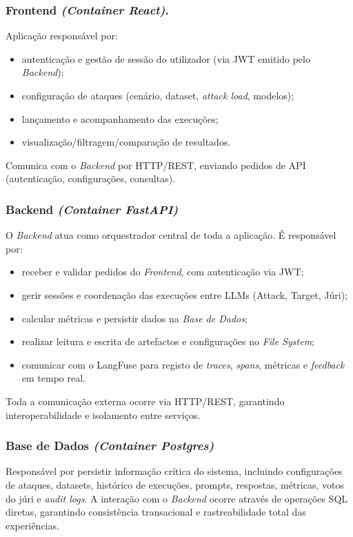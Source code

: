 \subsubsection{Frontend \textit{(Container React)}.}
Aplicação responsável por:
\begin{itemize}
\item autenticação e gestão de sessão do utilizador (via JWT emitido pelo \textit{Backend});
\item configuração de ataques (cenário, dataset, \textit{attack load}, modelos);
\item lançamento e acompanhamento das execuções;
\item visualização/filtragem/comparação de resultados.
\end{itemize}
Comunica com o \textit{Backend} por HTTP/REST, enviando pedidos de API (autenticação, configurações, consultas).

\subsubsection{Backend \textit{(Container FastAPI)}}
O \textit{Backend} atua como orquestrador central de toda a aplicação. É responsável por:
\begin{itemize}
\item receber e validar pedidos do \textit{Frontend}, com autenticação via JWT;
\item gerir sessões e coordenação das execuções entre LLMs (Attack, Target, Júri);
\item calcular métricas e persistir dados na \textit{Base de Dados};
\item realizar leitura e escrita de artefactos e configurações no \textit{File System};
\item comunicar com o LangFuse para registo de \textit{traces}, \textit{spans}, métricas e \textit{feedback} em tempo real.
\end{itemize}
Toda a comunicação externa ocorre via HTTP/REST, garantindo interoperabilidade e isolamento entre serviços.

\subsubsection{Base de Dados \textit{(Container Postgres)}}
Responsável por persistir informação crítica do sistema, incluindo configurações de ataques, datasets, histórico de execuções, prompts, respostas, métricas, votos do júri e \textit{audit logs}.
A interação com o \textit{Backend} ocorre através de operações SQL diretas, garantindo consistência transacional e rastreabilidade total das experiências.

